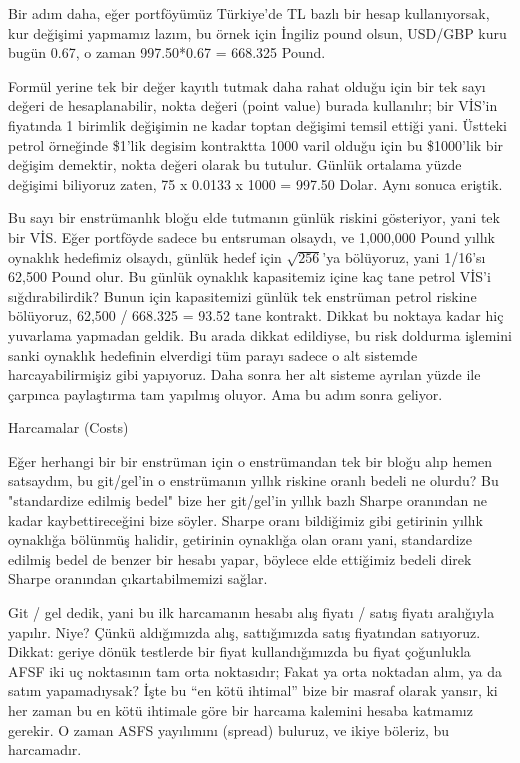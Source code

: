 \documentclass[12pt,fleqn]{article}\usepackage{../../common}
\begin{document}
Bir adım daha, eğer portföyümüz Türkiye'de TL bazlı bir hesap kullanıyorsak, kur
değişimi yapmamız lazım, bu örnek için İngiliz pound olsun, USD/GBP kuru bugün
0.67, o zaman 997.50*0.67 = 668.325 Pound.

Formül yerine tek bir değer kayıtlı tutmak daha rahat olduğu için bir tek sayı
değeri de hesaplanabilir, nokta değeri (point value) burada kullanılır; bir
VİS'in fiyatında 1 birimlik değişimin ne kadar toptan değişimi temsil ettiği
yani. Üstteki petrol örneğinde \$1'lik degisim kontraktta 1000 varil olduğu için
bu \$1000'lik bir değişim demektir, nokta değeri olarak bu tutulur. Günlük
ortalama yüzde değişimi biliyoruz zaten, 75 x 0.0133 x 1000 = 997.50 Dolar. Aynı
sonuca eriştik.

Bu sayı bir enstrümanlık bloğu elde tutmanın günlük riskini gösteriyor, yani tek
bir VİS. Eğer portföyde sadece bu entsruman olsaydı, ve 1,000,000 Pound yıllık
oynaklık hedefimiz olsaydı, günlük hedef için $\sqrt{256}$'ya bölüyoruz, yani
1/16'sı 62,500 Pound olur. Bu günlük oynaklık kapasitemiz içine kaç tane petrol
VİS'i sığdırabilirdik? Bunun için kapasitemizi günlük tek enstrüman petrol
riskine bölüyoruz, 62,500 / 668.325 = 93.52 tane kontrakt. Dikkat bu noktaya
kadar hiç yuvarlama yapmadan geldik. Bu arada dikkat edildiyse, bu risk doldurma
işlemini sanki oynaklık hedefinin elverdigi tüm parayı sadece o alt sistemde
harcayabilirmişiz gibi yapıyoruz. Daha sonra her alt sisteme ayrılan yüzde ile
çarpınca paylaştırma tam yapılmış oluyor. Ama bu adım sonra geliyor.

Harcamalar (Costs)

Eğer herhangi bir bir enstrüman için o enstrümandan tek bir bloğu alıp hemen
satsaydım, bu git/gel'in o enstrümanın yıllık riskine oranlı bedeli ne olurdu?
Bu "standardize edilmiş bedel" bize her git/gel'in yıllık bazlı Sharpe oranından
ne kadar kaybettireceğini bize söyler. Sharpe oranı bildiğimiz gibi getirinin
yıllık oynaklığa bölünmüş halidir, getirinin oynaklığa olan oranı yani,
standardize edilmiş bedel de benzer bir hesabı yapar, böylece elde ettiğimiz
bedeli direk Sharpe oranından çıkartabilmemizi sağlar.

Git / gel dedik, yani bu ilk harcamanın hesabı alış fiyatı / satış fiyatı
aralığıyla yapılır. Niye? Çünkü aldığımızda alış, sattığımızda satış fiyatından
satıyoruz. Dikkat: geriye dönük testlerde bir fiyat kullandığımızda bu fiyat
çoğunlukla AFSF iki uç noktasının tam orta noktasıdır; Fakat ya orta noktadan
alım, ya da satım yapamadıysak?  İşte bu ``en kötü ihtimal'' bize bir masraf
olarak yansır, ki her zaman bu en kötü ihtimale göre bir harcama kalemini hesaba
katmamız gerekir. O zaman ASFS yayılımını (spread) buluruz, ve ikiye böleriz, bu
harcamadır.
\end{document}

